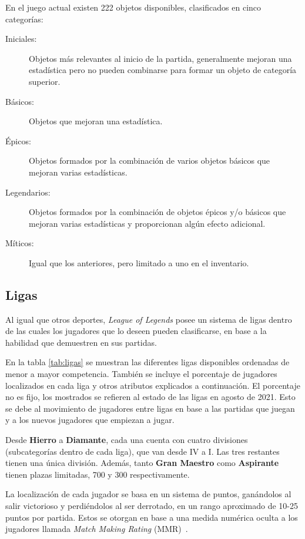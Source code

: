 En el juego actual existen 222 objetos disponibles, clasificados en cinco categorías:
\begin{description}
	\item[Iniciales:] Objetos más relevantes al inicio de la partida, generalmente mejoran una estadística pero no pueden combinarse para formar un objeto de categoría superior.
	\item[Básicos:] Objetos que mejoran una estadística.
	\item[Épicos:] Objetos formados por la combinación de varios objetos básicos que mejoran varias estadísticas.
	\item[Legendarios:] Objetos formados por la combinación de objetos épicos y/o básicos que mejoran varias estadísticas y proporcionan algún efecto adicional.
	\item[Míticos:] Igual que los anteriores, pero limitado a uno en el inventario.
\end{description}

\subsection{Ligas}
Al igual que otros deportes, \textit{League of Legends} posee un sistema de ligas dentro de las cuales los jugadores que lo deseen pueden clasificarse, en base a la habilidad que demuestren en sus partidas.

En la tabla \ref{tab:ligas} se muestran las diferentes ligas disponibles ordenadas de menor a mayor competencia. También se incluye el porcentaje de jugadores localizados en cada liga \cite{misc:player-distribution} y otros atributos explicados a continuación. El porcentaje no es fijo, los mostrados se refieren al estado de las ligas en agosto de 2021. Esto se debe al movimiento de jugadores entre ligas en base a las partidas que juegan y a los nuevos jugadores que empiezan a jugar.

Desde \textbf{Hierro} a \textbf{Diamante}, cada una cuenta con cuatro divisiones (subcategorías dentro de cada liga), que van desde IV a I. Las tres restantes tienen una única división. Además, tanto \textbf{Gran Maestro} como \textbf{Aspirante} tienen plazas limitadas, 700 y 300 respectivamente.

La localización de cada jugador se basa en un sistema de puntos, ganándolos al salir victorioso y perdiéndolos al ser derrotado, en un rango aproximado de 10-25 puntos por partida. Estos se otorgan en base a una medida numérica oculta a los jugadores llamada \textit{Match Making Rating} (MMR)~\cite{lol_wiki_rank}.

